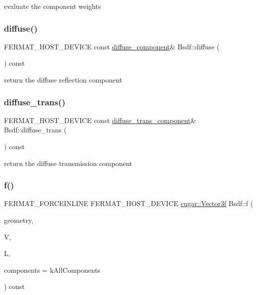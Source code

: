 evaluate the component weights \mbox{\label{struct_bsdf_a2c8d6de3e2d2a7d282d9cd510b8f96aa}} 
\subsubsection{\texorpdfstring{diffuse()}{diffuse()}}
{\footnotesize\ttfamily F\+E\+R\+M\+A\+T\+\_\+\+H\+O\+S\+T\+\_\+\+D\+E\+V\+I\+CE const \hyperlink{structcugar_1_1_lambert_bsdf}{diffuse\+\_\+component}\& Bsdf\+::diffuse (\begin{DoxyParamCaption}{ }\end{DoxyParamCaption}) const\hspace{0.3cm}{\ttfamily [inline]}}

return the diffuse reflection component \mbox{\label{struct_bsdf_a12d8619f56cc6b28b1e1bc6a4ae9d954}} 
\subsubsection{\texorpdfstring{diffuse\+\_\+trans()}{diffuse\_trans()}}
{\footnotesize\ttfamily F\+E\+R\+M\+A\+T\+\_\+\+H\+O\+S\+T\+\_\+\+D\+E\+V\+I\+CE const \hyperlink{structcugar_1_1_lambert_trans_bsdf}{diffuse\+\_\+trans\+\_\+component}\& Bsdf\+::diffuse\+\_\+trans (\begin{DoxyParamCaption}{ }\end{DoxyParamCaption}) const\hspace{0.3cm}{\ttfamily [inline]}}

return the diffuse transmission component \mbox{\label{struct_bsdf_a58f402b71508cb422ebe3f0e628fd2fd}} 
\subsubsection{\texorpdfstring{f()}{f()}\hspace{0.1cm}{\footnotesize\ttfamily [1/2]}}
{\footnotesize\ttfamily F\+E\+R\+M\+A\+T\+\_\+\+F\+O\+R\+C\+E\+I\+N\+L\+I\+NE F\+E\+R\+M\+A\+T\+\_\+\+H\+O\+S\+T\+\_\+\+D\+E\+V\+I\+CE \hyperlink{structcugar_1_1_vector}{cugar\+::\+Vector3f} Bsdf\+::f (\begin{DoxyParamCaption}\item[{const \hyperlink{structcugar_1_1_differential_geometry}{cugar\+::\+Differential\+Geometry} \&}]{geometry,  }\item[{const \hyperlink{structcugar_1_1_vector}{cugar\+::\+Vector3f}}]{V,  }\item[{const \hyperlink{structcugar_1_1_vector}{cugar\+::\+Vector3f}}]{L,  }\item[{const \hyperlink{struct_bsdf_a5f7db6f81220ed9ee6da109d6eb5b585}{Component\+Type}}]{components = {\ttfamily kAllComponents} }\end{DoxyParamCaption}) const\hspace{0.3cm}{\ttfamily [inline]}}

